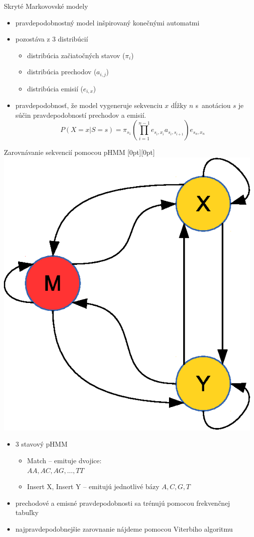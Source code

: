 \documentclass[xcolor=dvipsnames, compress, 12pt]{beamer}
\newcommand{\lenitem}[2][.6\linewidth]{\parbox[t]{#1}{\strut #2\strut}}
\theoremstyle{definition}
\begin{document}
\begin{frame}{Skryté Markovovské modely}
  \begin{itemize}
    \item pravdepodobnostný model inšpirovaný konečnými automatmi
    \item pozostáva z 3 distribúcií
    \begin{itemize}
        \item distribúcia začiatočných stavov ($\pi_i$)
        \item distribúcia prechodov ($a_{i,j}$)
        \item distribúcia emisií ($e_{i,x}$)
    \end{itemize}
    \pause
    \item pravdepodobnosť, že model vygeneruje sekvenciu $x$ dĺžky $n$ s~anotáciou $s$ je súčin pravdepodobností prechodov a emisií.
    $$P(X=x | S=s) = \pi_{s_1}\left(\prod_{i=1}^{n-1} e_{s_i,x_i} a_{s_i,s_{i+1}}\right)e_{s_n,x_n}$$
    \cite{skripta, durbin}

  \end{itemize}
\end{frame}

\begin{frame}{Zarovnávanie sekvencií pomocou pHMM}
  \mbox{}\hfill\raisebox{-\height}[0pt][0pt]{
   \includegraphics[width=.30\textwidth]{images/simple_model}
   }
  \vspace*{-\baselineskip}

  \begin{itemize}
    \item \lenitem{3 stavový pHMM}
    \begin{itemize}
      \item \lenitem{Match -- emituje dvojice:\\ $AA, AC, AG,\dots, TT$}
      \item \lenitem{Insert X, Insert Y -- emitujú jednotlivé bázy $A,C,G,T$}
    \end{itemize}
    \item \lenitem{prechodové a emisné pravdepodobnosti sa trénujú pomocou frekvenčnej tabuľky}
    \item najpravdepodobnejšie zarovnanie nájdeme pomocou Viterbiho algoritmu
  \end{itemize}
\end{frame}
\end{document}
